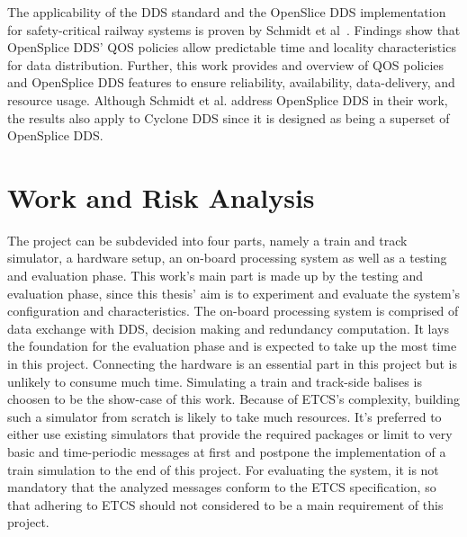 \documentclass[a4paper, 12pt]{scrartcl}
\begin{document}
The applicability of the \ac{DDS} standard and the OpenSlice DDS implementation for safety-critical railway systems is proven by Schmidt et al~\cite{SchmidtMissionCriticalChallenges}.
Findings show that OpenSplice DDS' \ac{QOS} policies allow predictable time and locality characteristics for data distribution.
Further, this work provides and overview of \ac{QOS} policies and OpenSplice DDS features to ensure reliability, availability, data-delivery, and resource usage.
Although Schmidt et al. address OpenSplice DDS in their work, the results also apply to Cyclone DDS since it is designed as being a superset of OpenSplice DDS.


\section*{Work and Risk Analysis}
The project can be subdevided into four parts, namely a train and track simulator, a hardware setup, an on-board processing system as well as a testing and evaluation phase.
This work's main part is made up by the testing and evaluation phase, since this thesis' aim is to experiment and evaluate the system's configuration and characteristics.
The on-board processing system is comprised of data exchange with \ac{DDS}, decision making and redundancy computation.
It lays the foundation for the evaluation phase and is expected to take up the most time in this project.
Connecting the hardware is an essential part in this project but is unlikely to consume much time.
Simulating a train and track-side balises is choosen to be the show-case of this work.
Because of \ac{ETCS}'s complexity, building such a simulator from scratch is likely to take much resources.
It's preferred to either use existing simulators that provide the required packages or limit to very basic and time-periodic messages at first and postpone the implementation of a train simulation to the end of this project.
For evaluating the system, it is not mandatory that the analyzed messages conform to the \ac{ETCS} specification, so that adhering to \ac{ETCS} should not considered to be a main requirement of this project.



\end{document}
